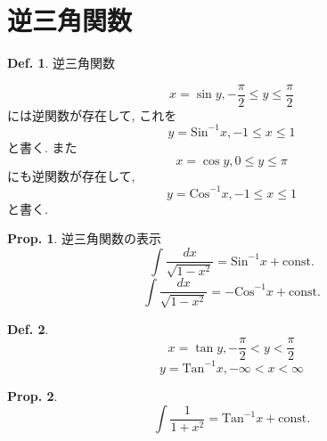 \documentclass[a4paper,10pt,report]{amsart}
\theoremstyle{plain}
\theoremstyle{definition}
\newtheorem{defn}{Def.}[section]
\newtheorem{prop}{Prop.}[section]
\theoremstyle{remark}
\begin{document}
    \section{逆三角関数}
    \begin{leftbar}
        \begin{defn}逆三角関数\par
            \begin{equation}
                x=\sin{y},-\frac{\pi}{2}\leq y\leq\frac{\pi}{2}
            \end{equation}
            には逆関数が存在して, これを
            \begin{equation}
                y=\mathrm{Sin}^{-1}x,-1\leq x\leq 1
            \end{equation}
            と書く. また
            \begin{equation}
                x=\cos{y},0\leq y\leq \pi
            \end{equation}
            にも逆関数が存在して,
            \begin{equation}
                y=\mathrm{Cos}^{-1}x,-1\leq x\leq 1
            \end{equation}
            と書く. 
        \end{defn}
    \end{leftbar}
    \begin{leftbar}
        \begin{prop}逆三角関数の表示
            \begin{equation}
                \int\frac{dx}{\sqrt{1-x^{2}}}=\mathrm{Sin}^{-1}x+\mathrm{const.}
            \end{equation}
            \begin{equation}
                \int\frac{dx}{\sqrt{1-x^{2}}}=-\mathrm{Cos}^{-1}x+\mathrm{const.}
            \end{equation}
        \end{prop}
    \end{leftbar}
    \begin{leftbar}
        \begin{defn}
            \begin{equation}
                x=\tan{y},-\frac{\pi}{2}<y<\frac{\pi}{2}
            \end{equation}
            \begin{equation}
                y=\mathrm{Tan}^{-1}x,-\infty<x<\infty
            \end{equation}
        \end{defn}
    \end{leftbar}
    \begin{leftbar}
        \begin{prop}
            \begin{equation}
                \int\frac{1}{1+x^{2}}=\mathrm{Tan}^{-1}x+\mathrm{const.}
            \end{equation}
        \end{prop}
    \end{leftbar}
\end{document}
